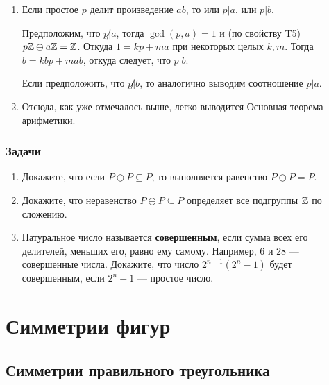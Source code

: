 \begin{enumerate}[T1]
\item Если простое $p$ делит произведение $ab$, то или $p|a$, или $p|b$.

Предположим, что $p\not|a$, тогда $\gcd(p,a)=1$ и (по свойству T5) $p\mathbb Z\oplus a\mathbb Z=\mathbb Z$. Откуда $1=kp+ma$ при некоторых целых $k,m$. Тогда $b=kbp+mab$, откуда следует, что $p|b$.

Если предположить, что $p\not|b$, то аналогично выводим соотношение $p|a$.
\item Отсюда, как уже отмечалось выше, легко выводится Основная теорема арифметики.
\end{enumerate}


\subsection*{Задачи}
\begin{enumerate}
\item Докажите, что если $P\ominus P\subseteq P$, то выполняется равенство $P\ominus P=P$.
\item Докажите, что неравенство $P\ominus P\subseteq P$ определяет все подгруппы $\mathbb Z$ по сложению.
\item Натуральное число называется \textbf{совершенным}, если сумма всех его делителей, меньших его, равно ему самому. Например, 6 и 28 --- совершенные числа. Докажите, что число $2^{n-1}(2^n-1)$ будет совершенным, если $2^n-1$ --- простое число.
\end{enumerate}



\chapter{Симметрии фигур}


\section{Симметрии правильного треугольника}


